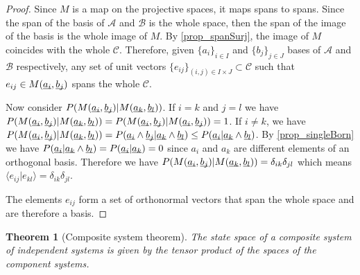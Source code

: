 \documentclass[aps,prl,amsmath,amssymb,twocolumn,nofootinbib]{revtex4}
\theoremstyle{plain}
\newtheorem{thrm}{Theorem}[section]
\theoremstyle{definition}
\theoremstyle{remark}
\newcommand{\pj}[1] {\underbar{$#1$}}
\def\>{\rangle}
\def\<{\langle}
\begin{document}
	\begin{proof}
		
		Since $M$ is a map on the projective spaces, it maps spans to spans.
		Since the span of the basis of $\mathcal{A}$ and $\mathcal{B}$ is
		the whole space, then the span of the image of the basis is the
		whole image of $M$. By \ref{prop_spanSurj}, the image of $M$
		coincides with the whole $\mathcal{C}$. Therefore, given
		$\{a_i\}_{i\in I}$ and $\{b_j\}_{j \in J}$ bases of $\mathcal{A}$
		and $\mathcal{B}$ respectively, any set of unit vectors
		$\{e_{ij}\}_{(i,j) \in I \times J} \subset \mathcal{C}$ such that
		$e_{ij} \in M(\pj{a_i}, \pj{b_j})$ spans the whole $\mathcal{C}$.
		
		Now consider $P(M(\pj{a_i},\pj{b_j})|M(\pj{a_k},\pj{b_l}))$. If $i=k$ and $j=l$ we have $P(M(\pj{a_i},\pj{b_j})|M(\pj{a_k},\pj{b_l}))= P(M(\pj{a_i},\pj{b_j})|M(\pj{a_i},\pj{b_j})) = 1$. If $i\neq k$, we have $P(M(\pj{a_i},\pj{b_j})|M(\pj{a_k},\pj{b_l})) = P(\pj{a_i} \wedge \pj{b_j} | \pj{a_k} \wedge \pj{b_l}) \leq P(\pj{a_i} | \pj{a_k} \wedge \pj{b_l})$. By \ref{prop_singleBorn} we have $P(\pj{a_i} | \pj{a_k} \wedge \pj{b_l}) = P(\pj{a_i} | \pj{a_k}) = 0$ since $a_i$ and $a_k$ are different elements of an orthogonal basis. Therefore we have $P(M(\pj{a_i},\pj{b_j})|M(\pj{a_k},\pj{b_l}))=\delta_{ik}\delta_{jl}$ which means $\<e_{ij} | e_{kl} \> = \delta_{ik}\delta_{jl}$.
		
		The elements $e_{ij}$ form a set of orthonormal vectors that span the whole space and are therefore a basis.
	\end{proof}
	
	\begin{thrm}[Composite system theorem]\label{theo}
		The state space of a composite system of independent systems is given by the tensor product of the spaces of the component systems.
	\end{thrm}
	
\end{document}

